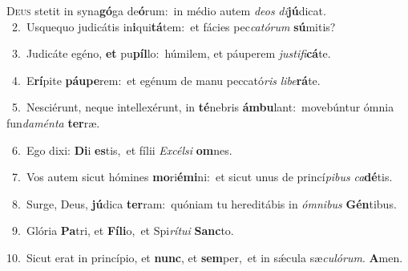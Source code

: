 \lettrine{\initial\textcolor{\initialcolor}{D}}{eus} stetit in syna\-\textbf{gó}\-ga de\-\textbf{ó}\-rum:~\star in médio autem \textit{de}\-\textit{os} \textit{di}\-\textbf{jú}dicat.\\
{\numbfont\textcolor{\numbcolor}{~2.}}~Usquequo judicátis in\-\textbf{i}\-qui\-\textbf{tá}\-tem:~\star et fácies pec\-\textit{ca}\-\textit{tó}\textit{rum} \textbf{sú}\-mitis?\par
{\numbfont\textcolor{\numbcolor}{~3.}}~Judicáte egéno, \textbf{et} pu\-\textbf{píl}\-lo:~\star húmilem, et páuperem \textit{jus}\-\textit{ti}\textit{fi}\textbf{cá}te.\par
{\numbfont\textcolor{\numbcolor}{~4.}}~E\-\textbf{rí}\-pite \textbf{páu}\-\textbf{pe}rem:~\star et egénum de manu peccató\textit{ris} \textit{li}\-\textit{be}\textbf{rá}te.\par
{\numbfont\textcolor{\numbcolor}{~5.}}~Nesciérunt, neque intellexérunt, in \textbf{té}\-nebris \textbf{ám}\-\textbf{bu}lant:~\star movebúntur ómnia fun\-\textit{da}\-\textit{mén}\textit{ta} \textbf{ter}\-ræ.\par
{\numbfont\textcolor{\numbcolor}{~6.}}~Ego dixi: \textbf{Di}\-i \textbf{es}\-tis,~\star et fílii \textit{Ex}\-\textit{cél}\textit{si} \textbf{om}\-nes.\par
{\numbfont\textcolor{\numbcolor}{~7.}}~Vos autem sicut hómines \textbf{mo}\-ri\-\textbf{é}\-\textbf{mi}ni:~\star et sicut unus de princí\-\textit{pi}\-\textit{bus} \textit{ca}\-\textbf{dé}tis.\par
{\numbfont\textcolor{\numbcolor}{~8.}}~Surge, Deus, \textbf{jú}\-dica \textbf{ter}\-ram:~\star quóniam tu hereditábis in \textit{óm}\-\textit{ni}\textit{bus} \textbf{Gén}\-tibus.\par
{\numbfont\textcolor{\numbcolor}{~9.}}~Glória \textbf{Pa}\-tri, et \textbf{Fí}\-\textbf{li}o,~\star et Spi\-\textit{rí}\-\textit{tu}\textit{i} \textbf{Sanc}\-to.\par
{\numbfont\textcolor{\numbcolor}{10.}}~Sicut erat in princípio, et \textbf{nunc}\-, et \textbf{sem}\-per,~\star et in sǽcula sæ\-\textit{cu}\-\textit{ló}\textit{rum}. \textbf{A}\-men.\par
